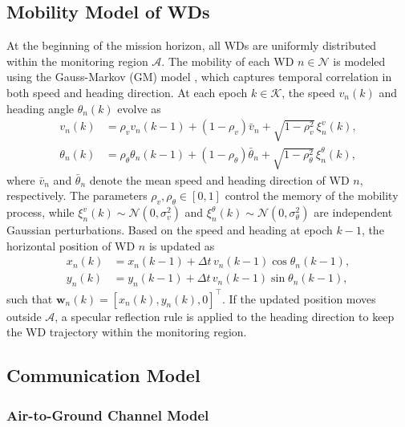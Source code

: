 \documentclass[journal]{IEEEtran}
\begin{document}
\subsection{Mobility Model of WDs}

At the beginning of the mission horizon, all WDs are uniformly distributed within the monitoring region $\mathcal{A}$. The mobility of each WD $n\in\mathcal{N}$ is modeled using the Gauss-Markov (GM) model \cite{11395508}, which captures temporal correlation in both speed and heading direction. At each epoch $k\in\mathcal{K}$, the speed $v_n(k)$ and heading angle $\theta_n(k)$ evolve as
\begin{align}
    v_n(k) &= \rho_v v_n(k-1) + (1-\rho_v)\bar{v}_n 
              + \sqrt{1-\rho_v^2}\,\xi_n^v(k), \label{eq:gm_speed}\\
    \theta_n(k) &= \rho_\theta \theta_n(k-1) + (1-\rho_\theta)\bar{\theta}_n 
              + \sqrt{1-\rho_\theta^2}\,\xi_n^\theta(k), 
              \label{eq:gm_direction}
\end{align}
where $\bar{v}_n$ and $\bar{\theta}_n$ denote the mean speed and heading direction of WD $n$, respectively. The parameters $\rho_v,\rho_\theta\in[0,1]$ control the memory of the mobility process, while $\xi_n^v(k)\sim\mathcal{N}(0,\sigma_v^2)$ and $\xi_n^\theta(k)\sim\mathcal{N}(0,\sigma_\theta^2)$ are independent Gaussian perturbations. Based on the speed and heading at epoch $k-1$, the horizontal position of WD $n$ is updated as
\begin{align}
    x_n(k) &= x_n(k-1) + \Delta t\, v_n(k-1)\cos\theta_n(k-1), 
               \label{eq:pos_x}\\
    y_n(k) &= y_n(k-1) + \Delta t\, v_n(k-1)\sin\theta_n(k-1),
               \label{eq:pos_y}
\end{align}
such that $\mathbf{w}_n(k)=[x_n(k),y_n(k),0]^\top$. If the updated position moves outside $\mathcal{A}$, a specular reflection rule is applied to the heading direction to keep the WD trajectory within the monitoring region.

\subsection{Communication Model}
\subsubsection{Air-to-Ground Channel Model}
\end{document}
